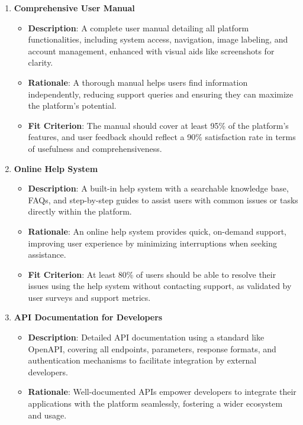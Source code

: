\documentclass[12pt]{article}
\begin{document}
\begin{enumerate}
    \item \textbf{Comprehensive User Manual}  
        \begin{itemize}[leftmargin=2cm]
            \item \textbf{Description}: A complete user manual detailing all platform functionalities, including system access, navigation, image labeling, and account management, enhanced with visual aids like screenshots for clarity.  
            \item \textbf{Rationale}: A thorough manual helps users find information independently, reducing support queries and ensuring they can maximize the platform’s potential.  
            \item \textbf{Fit Criterion}: The manual should cover at least 95\% of the platform's features, and user feedback should reflect a 90\% satisfaction rate in terms of usefulness and comprehensiveness.
        \end{itemize}
    \item \textbf{Online Help System}  
        \begin{itemize}[leftmargin=2cm]
            \item \textbf{Description}: A built-in help system with a searchable knowledge base, FAQs, and step-by-step guides to assist users with common issues or tasks directly within the platform.  
            \item \textbf{Rationale}: An online help system provides quick, on-demand support, improving user experience by minimizing interruptions when seeking assistance.  
            \item \textbf{Fit Criterion}: At least 80\% of users should be able to resolve their issues using the help system without contacting support, as validated by user surveys and support metrics.
        \end{itemize}
    \item \textbf{API Documentation for Developers}  
        \begin{itemize}[leftmargin=2cm]
            \item \textbf{Description}: Detailed API documentation using a standard like OpenAPI, covering all endpoints, parameters, response formats, and authentication mechanisms to facilitate integration by external developers.  
            \item \textbf{Rationale}: Well-documented APIs empower developers to integrate their applications with the platform seamlessly, fostering a wider ecosystem and usage.  

\end{itemize}
\end{enumerate}
\end{document}
